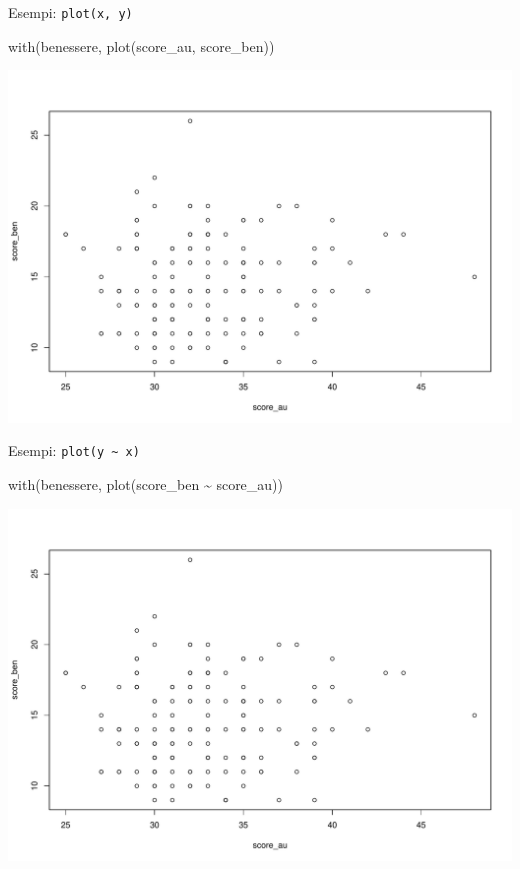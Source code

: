 \documentclass[
  ignorenonframetext,
]{beamer}
\newenvironment{Shaded}{\begin{snugshade}}{\end{snugshade}}
\newcommand{\FunctionTok}[1]{\textcolor[rgb]{0.39,0.29,0.61}{#1}}
\newcommand{\NormalTok}[1]{\textcolor[rgb]{0.12,0.11,0.11}{#1}}
\newcommand{\SpecialCharTok}[1]{\textcolor[rgb]{0.24,0.68,0.91}{#1}}
\begin{document}
\begin{frame}[fragile]{Esempi: \texttt{plot(x,\ y)}}
\protect\hypertarget{esempi-plotx-y}{}
\begin{Shaded}
\begin{Highlighting}[]
\FunctionTok{with}\NormalTok{(benessere, }
     \FunctionTok{plot}\NormalTok{(score\_au, score\_ben))}
\end{Highlighting}
\end{Shaded}

\begin{center}\includegraphics[width=0.7\linewidth]{Practice_files/figure-beamer/unnamed-chunk-39-1} \end{center}
\end{frame}

\begin{frame}[fragile]{Esempi: \texttt{plot(y\ \textasciitilde{}\ x)}}
\protect\hypertarget{esempi-ploty-x}{}
\begin{Shaded}
\begin{Highlighting}[]
\FunctionTok{with}\NormalTok{(benessere, }
     \FunctionTok{plot}\NormalTok{(score\_ben }\SpecialCharTok{\textasciitilde{}}\NormalTok{ score\_au))}
\end{Highlighting}
\end{Shaded}

\begin{center}\includegraphics[width=0.7\linewidth]{Practice_files/figure-beamer/unnamed-chunk-40-1} \end{center}
\end{frame}
\end{document}
